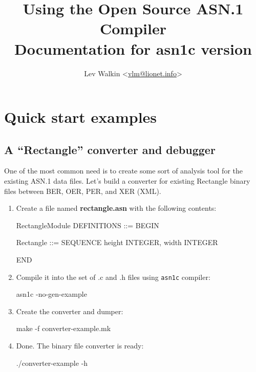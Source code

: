 \documentclass[english,oneside,12pt]{book}
\newcommand{\cmd}[1]{\texttt{#1}}
\begin{document}
\title{Using the Open Source ASN.1 Compiler\\
\vspace*{0.4cm}
\Large Documentation for asn1c version \asnver{}}
\author{Lev Walkin <\href{mailto:vlm@lionet.info?Subject=asn1c}{vlm@lionet.info}>}

\pagestyle{fancy}
\fancyhead[L]{\leftmark}
\maketitle

\tableofcontents{}

\chapter{\label{chap:Quick-start-examples}Quick start examples}

\section{A “Rectangle” converter and debugger}

One of the most common need is to create some sort of analysis tool
for the existing ASN.1 data files. Let's build a converter for existing
Rectangle binary files between BER, OER, PER, and XER (XML).

\begin{enumerate}
\item Create a file named \textbf{rectangle.asn} with the following contents:
\begin{asn}
RectangleModule DEFINITIONS ::= BEGIN

Rectangle ::= SEQUENCE {
    height  INTEGER,
    width   INTEGER
}

END
\end{asn}

\item Compile it into the set of .c and .h files using \cmd{asn1c} compiler:

\begin{bash}
asn1c -no-gen-example %
\end{bash}

\item Create the converter and dumper:

\begin{bash}
make -f converter-example.mk
\end{bash}

\item Done. The binary file converter is ready:

\begin{bash}
./converter-example -h
\end{bash}
\end{enumerate}
\end{document}
